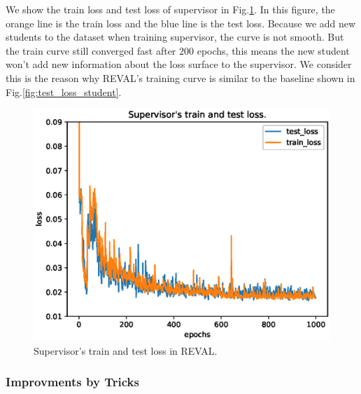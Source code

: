 \documentclass[english]{sobraep}
\begin{document}
We show the train loss and test loss of supervisor in Fig.\ref{fig:REVAL_train_test}. In this figure, the orange line is the train loss and the blue line is the test loss. Because we add new students to the dataset when training supervisor, the curve is not smooth. But the train curve still converged fast after $200$ epochs, this means the new student won't add new information about the loss surface to the supervisor. We consider this is the reason why REVAL's training curve is similar to the baseline shown in Fig.\ref{fig:test_loss_student}.

\begin{figure}
    \centering
    \captionsetup{justification=centering}
    \includegraphics[scale=0.5]{Figures/CIFAR10/sp_train_test.eps}
    \caption{Supervisor's train and test loss in REVAL.}
    \label{fig:REVAL_train_test}
\end{figure}

\subsubsection{Improvments by Tricks}
\end{document}
